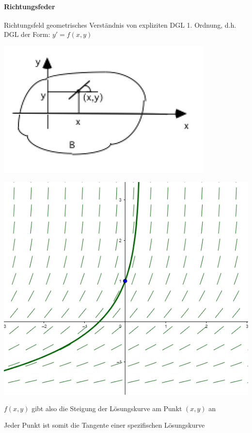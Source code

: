 \paragraph{Richtungsfeder}
\begin{definition}{Richtungsfeld} geometrisches Verständnis von expliziten DGL 1. Ordnung, d.h. DGL der Form:
  $y'=f(x,y)$
  \begin{minipage}{0.45\linewidth}
    \begin{center}
    \includegraphics[width=0.8\linewidth]{images/Richtungsfeld.png}
    \end{center}
  \end{minipage}
  \hspace{3mm}
  \begin{minipage}{0.45\linewidth}
    \begin{center}
    \includegraphics[width=0.8\linewidth]{images/RichtungsfeldKurve.png}
    \end{center}
  \end{minipage}

  \begin{minipage}{0.45\linewidth}
    \(f(x,y)\) gibt also die Steigung der Lösungskurve am Punkt \((x,y)\) an
  \end{minipage}
  \hspace{3mm}
  \begin{minipage}{0.45\linewidth}
    Jeder Punkt ist somit die Tangente einer spezifischen Lösungskurve
  \end{minipage}
\end{definition}

